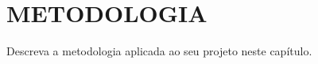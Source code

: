 \chapter{METODOLOGIA}
\label{chap:metodologia}

Descreva a metodologia aplicada ao seu projeto neste capítulo.